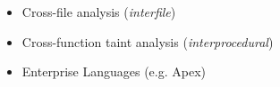 \documentclass[preview]{standalone}
\begin{document}
\begin{center}
\begin{itemize}
                   \item Cross-file analysis (\textit{interfile})
                   \item Cross-function taint analysis (\textit{interprocedural})
                   \item Enterprise Languages (e.g. Apex)
                  \end{itemize}
\end{center}
\end{document}
